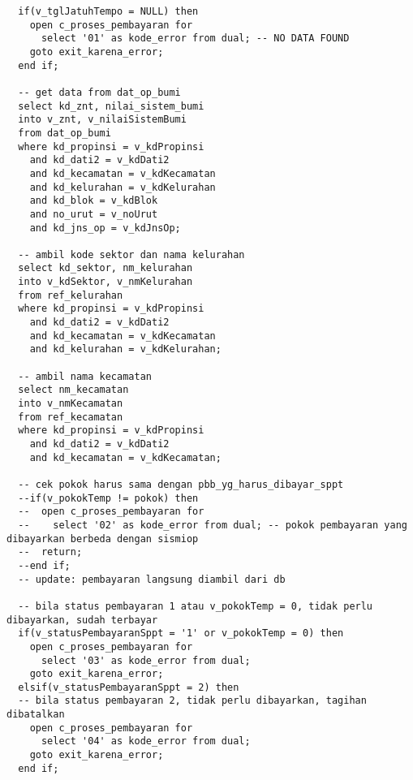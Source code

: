 \documentclass[pdftex,12pt, oneside]{article}
\begin{document}
\begin{lstlisting}
  if(v_tglJatuhTempo = NULL) then
    open c_proses_pembayaran for
      select '01' as kode_error from dual; -- NO DATA FOUND
    goto exit_karena_error;
  end if;

  -- get data from dat_op_bumi
  select kd_znt, nilai_sistem_bumi
  into v_znt, v_nilaiSistemBumi
  from dat_op_bumi
  where kd_propinsi = v_kdPropinsi
    and kd_dati2 = v_kdDati2
    and kd_kecamatan = v_kdKecamatan
    and kd_kelurahan = v_kdKelurahan
    and kd_blok = v_kdBlok
    and no_urut = v_noUrut
    and kd_jns_op = v_kdJnsOp;

  -- ambil kode sektor dan nama kelurahan
  select kd_sektor, nm_kelurahan
  into v_kdSektor, v_nmKelurahan
  from ref_kelurahan
  where kd_propinsi = v_kdPropinsi
    and kd_dati2 = v_kdDati2
    and kd_kecamatan = v_kdKecamatan
    and kd_kelurahan = v_kdKelurahan;

  -- ambil nama kecamatan
  select nm_kecamatan
  into v_nmKecamatan
  from ref_kecamatan
  where kd_propinsi = v_kdPropinsi
    and kd_dati2 = v_kdDati2
    and kd_kecamatan = v_kdKecamatan;

  -- cek pokok harus sama dengan pbb_yg_harus_dibayar_sppt
  --if(v_pokokTemp != pokok) then
  --  open c_proses_pembayaran for
  --    select '02' as kode_error from dual; -- pokok pembayaran yang dibayarkan berbeda dengan sismiop
  --  return;
  --end if;
  -- update: pembayaran langsung diambil dari db

  -- bila status pembayaran 1 atau v_pokokTemp = 0, tidak perlu dibayarkan, sudah terbayar
  if(v_statusPembayaranSppt = '1' or v_pokokTemp = 0) then
    open c_proses_pembayaran for
      select '03' as kode_error from dual;
    goto exit_karena_error;
  elsif(v_statusPembayaranSppt = 2) then
  -- bila status pembayaran 2, tidak perlu dibayarkan, tagihan dibatalkan
    open c_proses_pembayaran for
      select '04' as kode_error from dual;
    goto exit_karena_error;
  end if;


\end{lstlisting}
\end{document}
